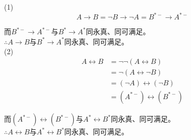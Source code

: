 \documentclass[hyperref, UTF8]{ctexart}
\begin{document}
(1)
$$
A\rightarrow B=\lnot B \rightarrow \lnot A = B^{*-} \rightarrow A^{*-}
$$

而$B^{*-} \rightarrow A^{*-}$与$B^* \rightarrow A^*$同永真、同可满足。\\

$\therefore$$A\rightarrow B$与$B^* \rightarrow A^*$同永真、同可满足。\\

(2)
\begin{align*}
A\leftrightarrow B &= \lnot \lnot (A \leftrightarrow B) \\&= \lnot (A \leftrightarrow \lnot B) \\&= ( \lnot A) \leftrightarrow ( \lnot B) \\ &= (A^{*-})\leftrightarrow (B^{*-})
\end{align*}

而$(A^{*-})\leftrightarrow (B^{*-})$与$A^* \leftrightarrow B^*$同永真、同可满足。\\

$\therefore$$A\leftrightarrow B$与$A^* \leftrightarrow B^*$同永真、同可满足。
\end{document}
